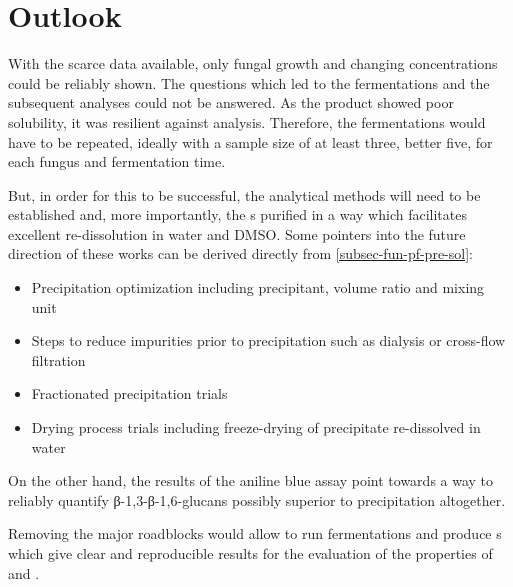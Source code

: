 \section{Outlook}
With the scarce data available, only fungal growth and changing \eps{} concentrations could be reliably shown. The questions which led to the fermentations and the subsequent analyses could not be answered. As the product showed poor solubility, it was resilient against analysis. Therefore, the fermentations would have to be repeated, ideally with a sample size of at least three, better five, for each fungus and fermentation time. 

But, in order for this to be successful, the analytical methods will need to be established and, more importantly, the \eps{}s purified in a way which facilitates excellent re-dissolution in water and DMSO. Some pointers into the future direction of these works can be derived directly from \vref{subsec-fun-pf-pre-sol}:
\begin{itemize}
	\item Precipitation optimization including precipitant, volume ratio and mixing unit
	\item Steps to reduce impurities prior to precipitation such as dialysis or cross-flow filtration
	\item Fractionated precipitation trials
	\item Drying process trials including freeze-drying of precipitate re-dissolved in water
\end{itemize}

On the other hand, the results of the aniline blue assay point towards a way to reliably quantify β-1,3-β-1,6-glucans possibly superior to precipitation altogether.

Removing the major roadblocks would allow to run fermentations and produce \eps{}s which give clear and reproducible results for the evaluation of the properties of \scl{} and \shz{}.

